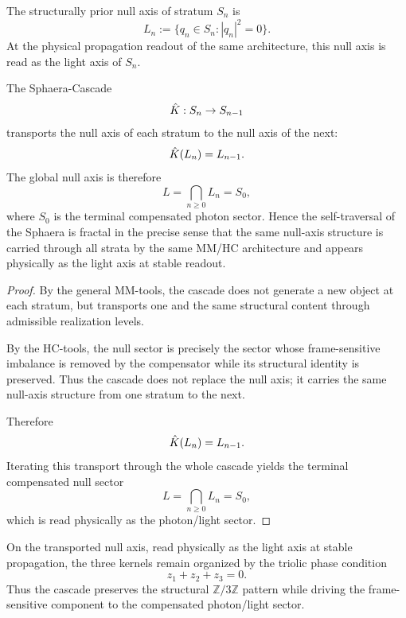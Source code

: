 \begin{definition}
The structurally prior null axis of stratum $S_n$ is
\[
L_n:=\{q_n\in S_n:|q_n|^2=0\}.
\]
At the physical propagation readout of the same architecture, this null
axis is read as the light axis of $S_n$.
\end{definition}

\begin{theorem}\label{thm:fractal}
The Sphaera-Cascade
\[
\hat{K}:S_n\to S_{n-1}
\]
transports the null axis of each stratum to the null axis of the next:
\[
\hat{K}(L_n)=L_{n-1}.
\]
The global null axis is therefore
\[
L=\bigcap_{n\ge 0}L_n=S_0,
\]
where $S_0$ is the terminal compensated photon sector.
Hence the self-traversal of the Sphaera is fractal in the precise sense
that the same null-axis structure is carried through all strata by the
same MM/HC architecture and appears physically as the light axis at
stable readout.
\end{theorem}

\begin{proof}
By the general MM-tools, the cascade does not generate a new object at
each stratum, but transports one and the same structural content through
admissible realization levels.

By the HC-tools, the null sector is precisely the sector whose
frame-sensitive imbalance is removed by the compensator while its
structural identity is preserved.
Thus the cascade does not replace the null axis; it carries the same
null-axis structure from one stratum to the next.

Therefore
\[
\hat{K}(L_n)=L_{n-1}.
\]
Iterating this transport through the whole cascade yields the terminal
compensated null sector
\[
L=\bigcap_{n\ge 0}L_n=S_0,
\]
which is read physically as the photon/light sector.
\end{proof}


\begin{remark}
On the transported null axis, read physically as the light axis at stable propagation, the three kernels remain organized by the
triolic phase condition
\[
z_1+z_2+z_3=0.
\]
Thus the cascade preserves the structural $\mathbb{Z}/3\mathbb{Z}$
pattern while driving the frame-sensitive component to the compensated
photon/light sector.
\end{remark}

